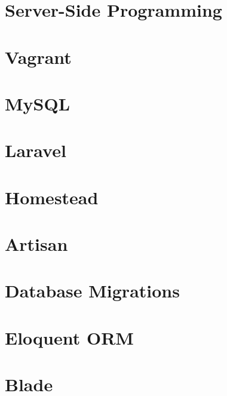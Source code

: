 \documentclass[b5paper,openany]{book}
\begin{document}
\tp


\tableofcontents




\chapter{Server-Side Programming}


\chapter{Vagrant}


\chapter{MySQL}


\chapter{Laravel}


\chapter{Homestead}


\chapter{Artisan}


\chapter{Database Migrations}


\chapter{Eloquent ORM}


\chapter{Blade}

\end{document}

